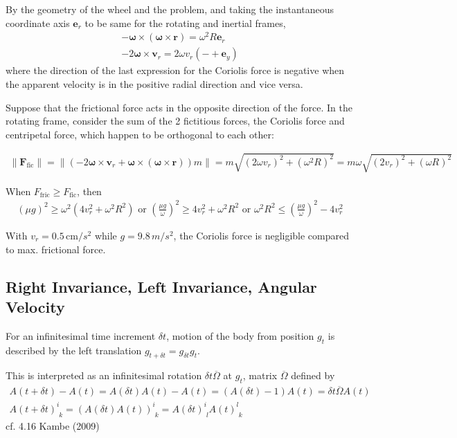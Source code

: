 \documentclass[10pt]{amsart}
\begin{document}
\begin{multicols*}{2}
By the geometry of the wheel and the problem, and taking the instantaneous coordinate axis $\mathbf{e}_r$ to be same for the rotating and inertial frames,
\[
\begin{gathered}
	-\mathbf{\omega} \times ( \mathbf{\omega} \times \mathbf{r}) = \omega^2 R \mathbf{e}_r \\
	-2 \mathbf{\omega} \times \mathbf{v}_r = 2 \omega v_r (-+ \mathbf{e}_y)
\end{gathered}
\]
where the direction of the last expression for the Coriolis force is negative when the apparent velocity is in the positive radial direction and vice versa.

Suppose that the frictional force acts in the opposite direction of the force. In the rotating frame, consider the sum of the 2 fictitious forces, the Coriolis force and centripetal force, which happen to be orthogonal to each other:

\[
\begin{gathered}
	\| \mathbf{F}_{\text{fic}} \| = \| ( - 2 \mathbf{\omega} \times \mathbf{v}_r  + \mathbf{\omega} \times (\mathbf{\omega} \times \mathbf{r})) m \| = m \sqrt{(2\omega v_r)^2 + (\omega^2 R)^2 } = m \omega \sqrt{(2v_r)^2 + (\omega R)^2 }
\end{gathered}
\]

When $F_{\text{fric}} \geq F_{\text{fic}}$, then 
\[
\begin{gathered}
	(\mu g)^2 \geq \omega^2 (4 v_r^2 + \omega^2 R^2) \text{ or } \left( \frac{ \mu g}{\omega} \right)^2 \geq 4 v_r^2 + \omega^2 R^2 \text{ or } \omega^2 R^2 \leq \left( \frac{\mu g}{\omega} \right)^2 - 4 v_r^2
\end{gathered}
\]

With $v_r = 0.5 \, \text{cm}/s^2 $ while $g = 9.8 \, m/s^2$, the Coriolis force is negligible compared to max. frictional force.

\subsection{Right Invariance, Left Invariance, Angular Velocity}

For an infinitesimal time increment $\delta t$, motion of the body from position $g_t$ is described by the left translation $g_{t+\delta t} = g_{\delta t}g_t$. 

This is interpreted as an infinitesimal rotation $\delta t \overline{\Omega}$ at $g_t$, matrix $\overline{\Omega}$ defined by 
\begin{equation}
\begin{gathered}
A(t + \delta t) - A(t) = A(\delta t) A(t) - A(t) = (A(\delta t) - 1) A(t) = \delta t \overline{\Omega} A(t) \\
A(t+\delta t)^i_{\, \, k} = (A(\delta t) A(t) )^i_{\, \, k} = A(\delta t)^i_{\, \, l} A(t)^l_{\, \, k}
\end{gathered}
\end{equation}
cf. 4.16 Kambe (2009) \cite{TKambe2009}


\end{multicols*}
\end{document}
